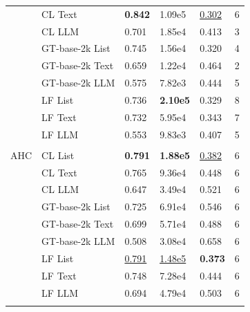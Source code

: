 \begin{table}[!h]
\begin{tabular}[t]{lllllr}
 & CL Text & \textbf{0.842} & 1.09e5 & \underline{0.302} & 6\\
\addlinespace
 & CL LLM & 0.701 & 1.85e4 & 0.413 & 3\\
 & GT-base-2k List & 0.745 & 1.56e4 & 0.320 & 4\\
 & GT-base-2k Text & 0.659 & 1.22e4 & 0.464 & 2\\
 & GT-base-2k LLM & 0.575 & 7.82e3 & 0.444 & 5\\
 & LF List & 0.736 & \textbf{2.10e5} & 0.329 & 8\\
\addlinespace
 & LF Text & 0.732 & 5.95e4 & 0.343 & 7\\
 & LF LLM & 0.553 & 9.83e3 & 0.407 & 5\\
\midrule\\
AHC & CL List & \textbf{0.791} & \textbf{1.88e5} & \underline{0.382} & 6\\
 & CL Text & 0.765 & 9.36e4 & 0.448 & 6\\
 & CL LLM & 0.647 & 3.49e4 & 0.521 & 6\\
\addlinespace
 & GT-base-2k List & 0.725 & 6.91e4 & 0.546 & 6\\
 & GT-base-2k Text & 0.699 & 5.71e4 & 0.488 & 6\\
 & GT-base-2k LLM & 0.508 & 3.08e4 & 0.658 & 6\\
 & LF List & \underline{0.791} & \underline{1.48e5} & \textbf{0.373} & 6\\
 & LF Text & 0.748 & 7.28e4 & 0.444 & 6\\
\addlinespace
 & LF LLM & 0.694 & 4.79e4 & 0.503 & 6\\
\midrule\\
\bottomrule
\end{tabular}
\end{table}
